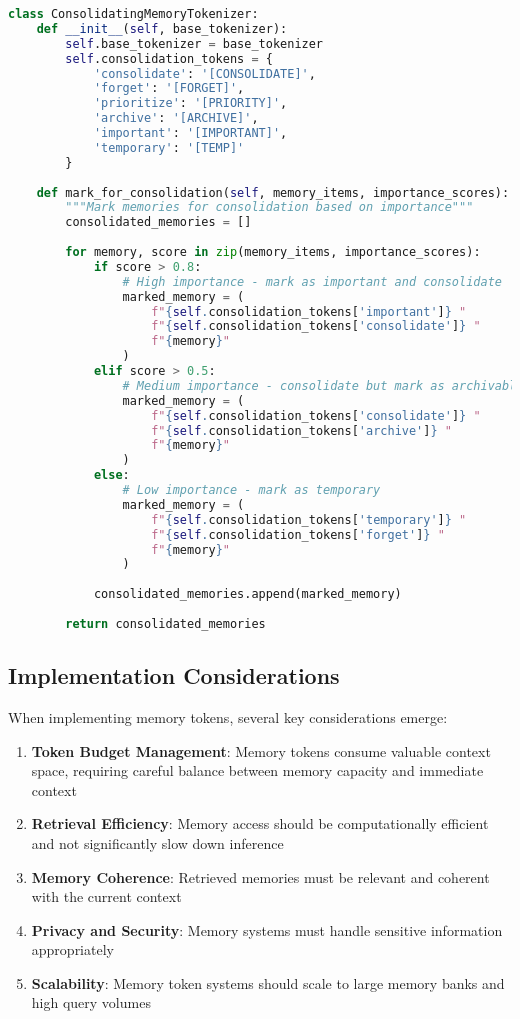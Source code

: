 \begin{lstlisting}[language=Python, caption=Memory consolidation with special tokens]
class ConsolidatingMemoryTokenizer:
    def __init__(self, base_tokenizer):
        self.base_tokenizer = base_tokenizer
        self.consolidation_tokens = {
            'consolidate': '[CONSOLIDATE]',
            'forget': '[FORGET]',
            'prioritize': '[PRIORITY]',
            'archive': '[ARCHIVE]',
            'important': '[IMPORTANT]',
            'temporary': '[TEMP]'
        }
    
    def mark_for_consolidation(self, memory_items, importance_scores):
        """Mark memories for consolidation based on importance"""
        consolidated_memories = []
        
        for memory, score in zip(memory_items, importance_scores):
            if score > 0.8:
                # High importance - mark as important and consolidate
                marked_memory = (
                    f"{self.consolidation_tokens['important']} "
                    f"{self.consolidation_tokens['consolidate']} "
                    f"{memory}"
                )
            elif score > 0.5:
                # Medium importance - consolidate but mark as archivable
                marked_memory = (
                    f"{self.consolidation_tokens['consolidate']} "
                    f"{self.consolidation_tokens['archive']} "
                    f"{memory}"
                )
            else:
                # Low importance - mark as temporary
                marked_memory = (
                    f"{self.consolidation_tokens['temporary']} "
                    f"{self.consolidation_tokens['forget']} "
                    f"{memory}"
                )
            
            consolidated_memories.append(marked_memory)
        
        return consolidated_memories
\end{lstlisting}

\subsection{Implementation Considerations}

When implementing memory tokens, several key considerations emerge:

\begin{enumerate}
\item \textbf{Token Budget Management}: Memory tokens consume valuable context space, requiring careful balance between memory capacity and immediate context
\item \textbf{Retrieval Efficiency}: Memory access should be computationally efficient and not significantly slow down inference
\item \textbf{Memory Coherence}: Retrieved memories must be relevant and coherent with the current context
\item \textbf{Privacy and Security}: Memory systems must handle sensitive information appropriately
\item \textbf{Scalability}: Memory token systems should scale to large memory banks and high query volumes
\end{enumerate}

